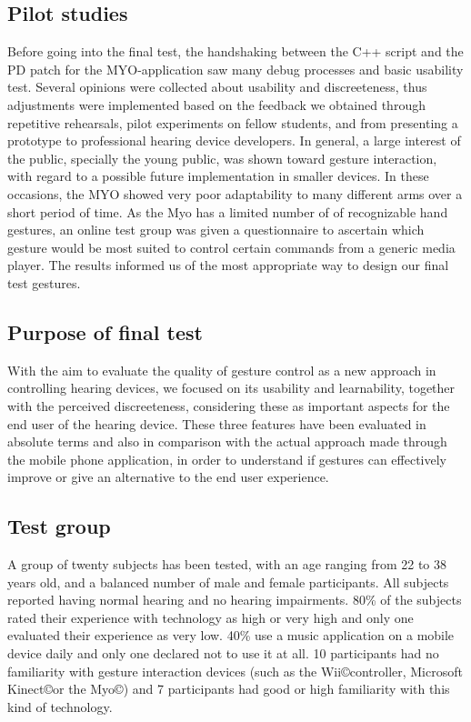 \documentclass[journal]{./IEEEtran}
\begin{document}
\subsection{Pilot studies}
Before going into the final test, the handshaking between the C++ script and the PD patch for the MYO-application saw many debug processes and basic usability test. Several opinions were collected about usability and discreeteness, thus adjustments were implemented based on the feedback we obtained through repetitive rehearsals, pilot experiments on fellow students, and from presenting a prototype to professional hearing device developers.
In general, a large interest of the public, specially the young public, was shown toward gesture interaction, with regard to a possible future implementation in smaller devices. In these occasions, the MYO showed very poor adaptability to many different arms over a short period of time.
As the Myo has a limited number of of recognizable hand gestures, an online test group was given a questionnaire to ascertain which gesture would be most suited to control certain commands from a generic media player. The results informed us of the most appropriate way to design our final test gestures.

\subsection{Purpose of final test}
With the aim to evaluate the quality of gesture control as a new approach in controlling hearing devices, we focused on its usability and learnability, together with the perceived discreeteness, considering these as important aspects for the end user of the hearing device. These three features have been evaluated in absolute terms and also in comparison with the actual approach made through the mobile phone application, in order to understand if gestures can effectively improve or give an alternative to the end user experience.

\subsection{Test group}
A group of twenty subjects has been tested, with an age ranging from 22 to 38 years old, and a balanced number of male and female participants. All subjects reported having normal hearing and no hearing impairments. 80\% of the subjects rated their experience with technology as high or very high and only one evaluated their  experience as very low. 40\% use  a music application on a mobile device daily and only one declared not to use it at all. 10 participants had no familiarity with gesture interaction devices (such as the Wii\copyright controller, Microsoft Kinect\copyright or the Myo\copyright) and 7 participants had good or high familiarity with this kind of technology.
\end{document}
